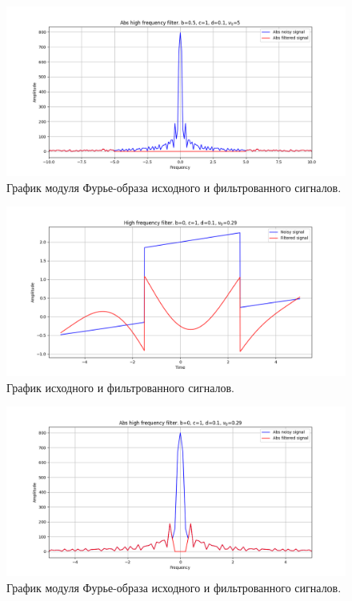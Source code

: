 \documentclass[a4paper, 12pt]{article}
\begin{document}
    \begin{figure}[!htb]
        \centering
        \includegraphics[scale=0.485]{14_abs_u_U_nolow.png}
        \captionsetup{skip=0pt}
        \caption{График модуля Фурье-образа исходного и фильтрованного сигналов.}
        \label{fig:fig54}
    \end{figure}
    \begin{figure}[!htb]
        \centering
        \includegraphics[scale=0.485]{15_u_flt_u_nolow.png}
        \captionsetup{skip=0pt}
        \caption{График исходного и фильтрованного сигналов.}
        \label{fig:fig55}
    \end{figure}
    \begin{figure}[!htb]
        \centering
        \includegraphics[scale=0.485]{15_abs_u_U_nolow.png}
        \captionsetup{skip=0pt}
        \caption{График модуля Фурье-образа исходного и фильтрованного сигналов.}
        \label{fig:fig56}
    \end{figure}
\end{document}
